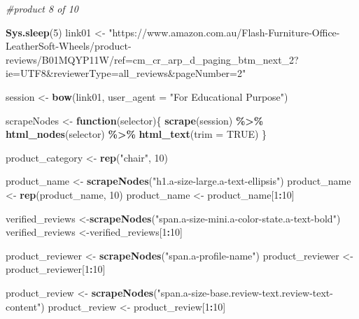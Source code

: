 \documentclass[
]{article}
\newenvironment{Shaded}{\begin{snugshade}}{\end{snugshade}}
\newcommand{\AttributeTok}[1]{\textcolor[rgb]{0.13,0.29,0.53}{#1}}
\newcommand{\CommentTok}[1]{\textcolor[rgb]{0.56,0.35,0.01}{\textit{#1}}}
\newcommand{\ConstantTok}[1]{\textcolor[rgb]{0.56,0.35,0.01}{#1}}
\newcommand{\ControlFlowTok}[1]{\textcolor[rgb]{0.13,0.29,0.53}{\textbf{#1}}}
\newcommand{\DecValTok}[1]{\textcolor[rgb]{0.00,0.00,0.81}{#1}}
\newcommand{\FunctionTok}[1]{\textcolor[rgb]{0.13,0.29,0.53}{\textbf{#1}}}
\newcommand{\NormalTok}[1]{#1}
\newcommand{\OtherTok}[1]{\textcolor[rgb]{0.56,0.35,0.01}{#1}}
\newcommand{\SpecialCharTok}[1]{\textcolor[rgb]{0.81,0.36,0.00}{\textbf{#1}}}
\newcommand{\StringTok}[1]{\textcolor[rgb]{0.31,0.60,0.02}{#1}}
\begin{document}
\begin{Shaded}
\begin{Highlighting}[]
\CommentTok{\#product 8 of 10}
  
\FunctionTok{Sys.sleep}\NormalTok{(}\DecValTok{5}\NormalTok{)}
\NormalTok{link01 }\OtherTok{\textless{}{-}} \StringTok{"https://www.amazon.com.au/Flash{-}Furniture{-}Office{-}LeatherSoft{-}Wheels/product{-}reviews/B01MQYP11W/ref=cm\_cr\_arp\_d\_paging\_btm\_next\_2?ie=UTF8\&reviewerType=all\_reviews\&pageNumber=2"}


\NormalTok{  session }\OtherTok{\textless{}{-}} \FunctionTok{bow}\NormalTok{(link01,}
               \AttributeTok{user\_agent =} \StringTok{"For Educational Purpose"}\NormalTok{)}

\NormalTok{  scrapeNodes }\OtherTok{\textless{}{-}} \ControlFlowTok{function}\NormalTok{(selector)\{}
    \FunctionTok{scrape}\NormalTok{(session) }\SpecialCharTok{\%\textgreater{}\%}
      \FunctionTok{html\_nodes}\NormalTok{(selector) }\SpecialCharTok{\%\textgreater{}\%}
      \FunctionTok{html\_text}\NormalTok{(}\AttributeTok{trim =} \ConstantTok{TRUE}\NormalTok{)}
\NormalTok{  \}}

\NormalTok{  product\_category }\OtherTok{\textless{}{-}} \FunctionTok{rep}\NormalTok{(}\StringTok{"chair"}\NormalTok{, }\DecValTok{10}\NormalTok{)}

\NormalTok{  product\_name }\OtherTok{\textless{}{-}} \FunctionTok{scrapeNodes}\NormalTok{(}\StringTok{"h1.a{-}size{-}large.a{-}text{-}ellipsis"}\NormalTok{)}
\NormalTok{  product\_name }\OtherTok{\textless{}{-}} \FunctionTok{rep}\NormalTok{(product\_name, }\DecValTok{10}\NormalTok{)}
\NormalTok{  product\_name }\OtherTok{\textless{}{-}}\NormalTok{ product\_name[}\DecValTok{1}\SpecialCharTok{:}\DecValTok{10}\NormalTok{]}
  
\NormalTok{  verified\_reviews }\OtherTok{\textless{}{-}}\FunctionTok{scrapeNodes}\NormalTok{(}\StringTok{"span.a{-}size{-}mini.a{-}color{-}state.a{-}text{-}bold"}\NormalTok{)}
\NormalTok{  verified\_reviews }\OtherTok{\textless{}{-}}\NormalTok{verified\_reviews[}\DecValTok{1}\SpecialCharTok{:}\DecValTok{10}\NormalTok{]}
  
\NormalTok{  product\_reviewer }\OtherTok{\textless{}{-}} \FunctionTok{scrapeNodes}\NormalTok{(}\StringTok{"span.a{-}profile{-}name"}\NormalTok{)}
\NormalTok{  product\_reviewer }\OtherTok{\textless{}{-}}\NormalTok{ product\_reviewer[}\DecValTok{1}\SpecialCharTok{:}\DecValTok{10}\NormalTok{]}
  
\NormalTok{  product\_review }\OtherTok{\textless{}{-}} \FunctionTok{scrapeNodes}\NormalTok{(}\StringTok{"span.a{-}size{-}base.review{-}text.review{-}text{-}content"}\NormalTok{)}
\NormalTok{  product\_review }\OtherTok{\textless{}{-}}\NormalTok{ product\_review[}\DecValTok{1}\SpecialCharTok{:}\DecValTok{10}\NormalTok{]}
  

\end{Highlighting}
\end{Shaded}
\end{document}
